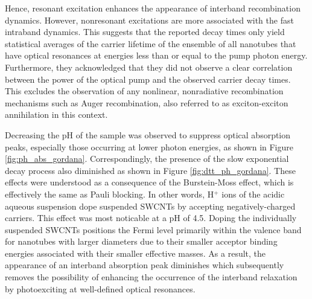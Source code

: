 Hence, resonant excitation enhances the appearance of interband recombination dynamics. However, nonresonant excitations are more associated with the fast intraband dynamics. This suggests that the reported decay times only yield statistical averages of the carrier lifetime of the ensemble of all nanotubes that have optical resonances at energies less than or equal to the pump photon energy. Furthermore, they acknowledged that they did not observe a clear correlation between the power of the optical pump and the observed carrier decay times. This excludes the observation of any nonlinear, nonradiative recombination mechanisms such as Auger recombination, also referred to as exciton-exciton annihilation in this context.

Decreasing the pH of the sample was observed to suppress optical absorption peaks, especially those occurring at lower photon energies, as shown in Figure \ref{fig:ph_abs_gordana}. Correspondingly, the presence of the slow exponential decay process also diminished as shown in Figure \ref{fig:dtt_ph_gordana}. These effects were understood as a consequence of the Burstein-Moss effect, which is effectively the same as Pauli blocking. In other words, H$^+$ ions of the acidic aqueous suspension dope suspended SWCNTs by accepting negatively-charged carriers. This effect was most noticable at a pH of 4.5. Doping the individually suspended SWCNTs positions the Fermi level primarily within the valence band for nanotubes with larger diameters due to their smaller acceptor binding energies associated with their smaller effective masses.  As a result, the appearance of an interband absorption peak diminishes which subsequently removes the possibility of enhancing the occurrence of the interband relaxation by photoexciting at well-defined optical resonances.

\vspace{3cm}

